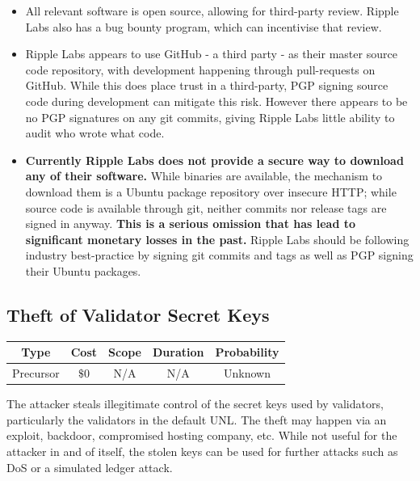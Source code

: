\documentclass{article}
\begin{document}
\begin{itemize}

    \item All relevant software is open source, allowing for third-party
        review. Ripple Labs also has a bug bounty program, which can
        incentivise that review.

    \item Ripple Labs appears to use GitHub - a third party -
        as their master source code repository, with development happening
        through pull-requests on GitHub. While this does place trust in a
        third-party, PGP signing source code during development can mitigate
        this risk. However there appears to be no PGP signatures on any git
        commits, giving Ripple Labs little ability to audit who wrote what
        code.

    \item \textbf{Currently Ripple Labs does not provide a secure way to
        download any of their software.} While binaries are available, the
        mechanism to download them is a Ubuntu package repository over insecure
        HTTP; while source code is available through git, neither commits nor
        release tags are signed in anyway. \textbf{This is a serious omission
        that has lead to significant monetary losses in the past.} Ripple Labs
        should be following industry best-practice by signing git commits and
        tags\cite{wladimir-git-pgp} as well as PGP signing their Ubuntu
        packages.

\end{itemize}


\subsection{Theft of Validator Secret Keys}

\begin{center}
    \begin{tabular}{c|c|c|c|c}
        Type & Cost & Scope & Duration & Probability \\ \hline
        Precursor & $\$0$ & N/A & N/A & Unknown \\
    \end{tabular}
\end{center}

The attacker steals illegitimate control of the secret keys used by validators,
particularly the validators in the default UNL. The theft may happen via an
exploit, backdoor, compromised hosting company, etc. While not useful for the
attacker in and of itself, the stolen keys can be used for further attacks such as
DoS or a simulated ledger attack.
\end{document}
